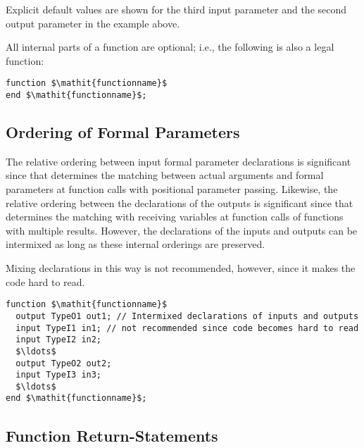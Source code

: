 \begin{nonnormative}
Explicit default values are shown for the third input parameter and the second output parameter in the example above.
\end{nonnormative}

\begin{nonnormative}
All internal parts of a function are optional; i.e., the following is also a legal function:
\begin{lstlisting}[language=modelica]
function $\mathit{functionname}$
end $\mathit{functionname}$;
\end{lstlisting}
\end{nonnormative}

\subsection{Ordering of Formal Parameters}\label{ordering-of-formal-parameters}

The relative ordering between input formal parameter declarations is
significant since that determines the matching between actual arguments
and formal parameters at function calls with positional parameter
passing. Likewise, the relative ordering between the declarations of the
outputs is significant since that determines the matching with receiving
variables at function calls of functions with multiple results. However,
the declarations of the inputs and outputs can be intermixed as long as
these internal orderings are preserved.

\begin{nonnormative}
Mixing declarations in this way is not recommended, however, since it makes the code hard to read.
\end{nonnormative}

\begin{example}
\begin{lstlisting}[language=modelica]
function $\mathit{functionname}$
  output TypeO1 out1; // Intermixed declarations of inputs and outputs
  input TypeI1 in1; // not recommended since code becomes hard to read
  input TypeI2 in2;
  $\ldots$
  output TypeO2 out2;
  input TypeI3 in3;
  $\ldots$
end $\mathit{functionname}$;
\end{lstlisting}
\end{example}

\subsection{Function Return-Statements}\label{function-return-statements}

